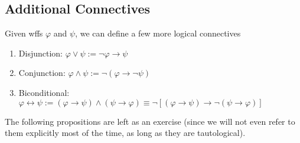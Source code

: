 \documentclass{treatise}
\begin{document}
\subsection{Additional Connectives}
Given wffs $\varphi$ and $\psi$, we can define a few more logical connectives
\begin{enumerate}
    \item Disjunction: $\varphi \vee \psi := \neg \varphi \to \psi$
    \item Conjunction: $\varphi \wedge \psi := \neg (\varphi \to \neg \psi)$
    \item Biconditional: $\varphi \leftrightarrow \psi := (\varphi \to \psi) \wedge (\psi \to \varphi) \equiv \neg [(\varphi \to \psi) \to \neg (\psi \to \varphi)]$
\end{enumerate}
The following propositions are left as an exercise (since we will not even refer to them explicitly most of the time, as long as they are tautological).
\end{document}
